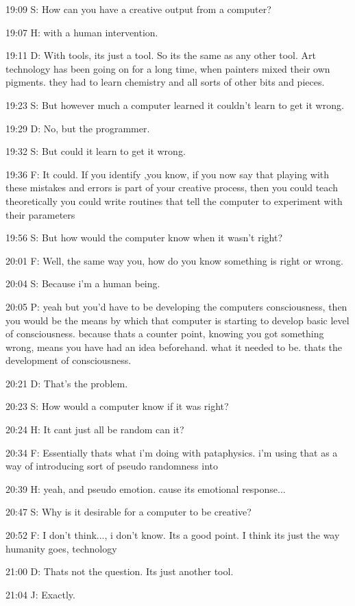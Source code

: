 19:09 S: How can you have a creative output from a computer?

19:07 H: with a human intervention.

19:11 D: With tools, its just a tool. So its the same as any other tool. Art technology has been going on for a long time, when painters mixed their own pigments. they had to learn chemistry and all sorts of other bits and pieces.

19:23 S: But however much a computer learned it couldn't learn to get it wrong.

19:29 D: No, but the programmer.

19:32 S: But could it learn to get it wrong.

19:36 F: It could. If you identify ,you know, if you now say that playing with these mistakes and errors is part of your creative process, then you could teach theoretically you could write routines that tell the computer to experiment with their parameters

19:56 S: But how would the computer know when it wasn't right?

20:01 F: Well, the same way you, how do you know something is right or wrong.

20:04 S: Because i'm a human being.

20:05 P: yeah but you'd have to be developing the computers consciousness, then you would be the means by which that computer is starting to develop basic level of consciousness. because thats a counter point, knowing you got something wrong, means you have had an idea beforehand. what it needed to be. thats the development of consciousness.

20:21 D: That's the problem.

20:23 S: How would a computer know if it was right?

20:24 H: It cant just all be random can it?

20:34 F: Essentially thats what i'm doing with pataphysics. i'm using that as a way of introducing sort of pseudo randomness into

20:39 H: yeah, and pseudo emotion. cause its emotional response...

20:47 S: Why is it desirable for a computer to be creative?

20:52 F: I don't think..., i don't know. Its a good point. I think its just the way humanity goes, technology

21:00 D: Thats not the question. Its just another tool.

21:04 J: Exactly.

